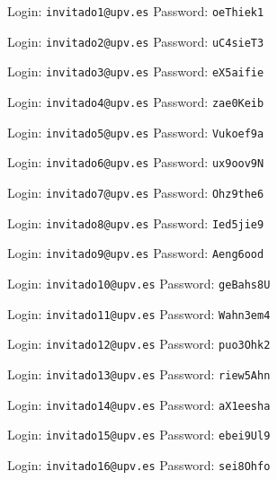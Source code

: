 \documentclass[12pt]{article}
\begin{document}
\Large

\vspace{2cm}

Login: \texttt{invitado1@upv.es} Password: \texttt{oeThiek1}
\vspace{2cm}

Login: \texttt{invitado2@upv.es} Password: \texttt{uC4sieT3}
\vspace{2cm}

Login: \texttt{invitado3@upv.es} Password: \texttt{eX5aifie}
\vspace{2cm}

Login: \texttt{invitado4@upv.es} Password: \texttt{zae0Keib}
\vspace{2cm}

Login: \texttt{invitado5@upv.es} Password: \texttt{Vukoef9a}
\vspace{2cm}

Login: \texttt{invitado6@upv.es} Password: \texttt{ux9oov9N}
\vspace{2cm}

Login: \texttt{invitado7@upv.es} Password: \texttt{Ohz9the6}
\vspace{2cm}

Login: \texttt{invitado8@upv.es} Password: \texttt{Ied5jie9}
\vspace{2cm}

Login: \texttt{invitado9@upv.es} Password: \texttt{Aeng6ood}
\vspace{2cm}

Login: \texttt{invitado10@upv.es} Password: \texttt{geBahs8U}
\vspace{2cm}

Login: \texttt{invitado11@upv.es} Password: \texttt{Wahn3em4}
\vspace{2cm}

Login: \texttt{invitado12@upv.es} Password: \texttt{puo3Ohk2}
\vspace{2cm}

Login: \texttt{invitado13@upv.es} Password: \texttt{riew5Ahn}
\vspace{2cm}

Login: \texttt{invitado14@upv.es} Password: \texttt{aX1eesha}
\vspace{2cm}

Login: \texttt{invitado15@upv.es} Password: \texttt{ebei9Ul9}
\vspace{2cm}

Login: \texttt{invitado16@upv.es} Password: \texttt{sei8Ohfo}
\vspace{2cm}
\end{document}
